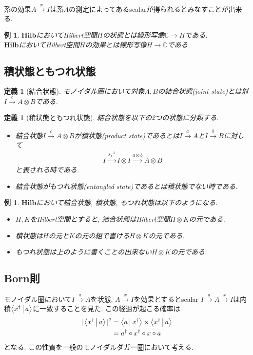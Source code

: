 \documentclass[a4paper,12pt]{ltjsarticle}
\theoremstyle{break}
\newtheorem{defn}[thm]{定義}
\newtheorem{eg}[thm]{例}
\newcommand{\hilb}{\mathbf{Hilb}}
\newcommand{\mbc}{\mathbb{C}}
\newcommand{\xr}[1]{\xrightarrow{#1}}
\newcommand{\la}{\lambda}
\newcommand{\da}{\dagger}
\newcommand{\ot}{\otimes}
\newcommand{\ti}{\times}
\numberwithin{equation}{section}
\begin{document}
系の効果$A \xr{x} I$は系$A$の測定によってあるscalarが得られるとみなすことが出来る. 

\begin{eg}
  $\hilb$においてHilbert空間$H$の状態とは線形写像$\mbc \to H$である. \\ 
  $\hilb$においてHilbert空間$H$の効果とは線形写像$H \to \mbc$である. 
\end{eg}

\subsection{積状態ともつれ状態}

\begin{defn}[結合状態]
  モノイダル圏において対象$A,B$の結合状態(joint state)とは射$I \xr{c} A \ot B$である. 
\end{defn}  

\begin{defn}[積状態ともつれ状態]
  結合状態を以下の2つの状態に分類する. 
  \begin{itemize}
    \item 結合状態$I \xr{c} A \ot B$が積状態(product state)であるとは$I \xr{a} A$と$I \xr{b} B$に対して
    \begin{align*}
      I \xr{\la_I^{-1}} I \ot I \xr{a \ot b} A \ot B
    \end{align*}
    と表される時である. 
    \item 結合状態がもつれ状態(entangled state)であるとは積状態でない時である.  
  \end{itemize}  
\end{defn}

\begin{eg}
  $\hilb$において結合状態, 積状態, もつれ状態は以下のようになる. 
  \begin{itemize}
    \item $H,K$をHilbert空間とすると, 結合状態はHilbert空間$H \ot K$の元である. 
    \item 積状態は$H$の元と$K$の元の組で書ける$H \ot K$の元である. 
    \item もつれ状態は上のように書くことの出来ない$H \ot K$の元である. 
  \end{itemize} 
\end{eg}

\subsection{Born則}

モノイダル圏において$I \xr{a} A$を状態, $A \xr{x} I$を効果とするとscalar $I \xr{a} A \xr{x} I$は内積$\Braket{x^\da|a}$に一致することを見た. 
この経過が起こる確率は
\begin{align*}
  |\Braket{x^\da|a}|^2 
  &= \Braket{a|x^\da} \ti \Braket{x^\da|a} \\
  &= a^\da \circ x^\da \circ x \circ a
\end{align*}
となる. 
この性質を一般のモノイダルダガー圏において考える. 
\end{document}
